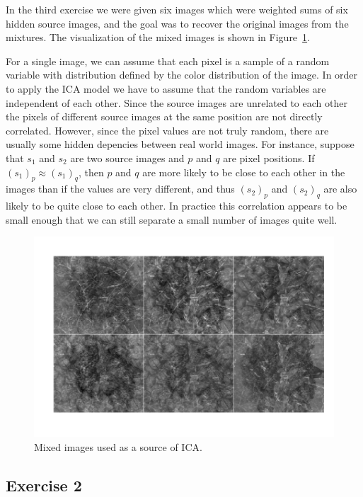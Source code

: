 \documentclass{article}
\begin{document}
In the third exercise we were given six images which were weighted sums of six hidden source images, and the goal was to recover the original images from the mixtures.
The visualization of the mixed images is shown in Figure~\ref{fig:mixed}.

For a single image, we can assume that each pixel is a sample of a random variable with distribution defined by the color distribution of the image.
In order to apply the ICA model we have to assume that the random variables are independent of each other.
Since the source images are unrelated to each other the pixels of different source images at the same position are not directly correlated.
However, since the pixel values are not truly random, there are usually some hidden depencies between real world images.
For instance, suppose that $s_1$ and $s_2$ are two source images and $p$ and $q$ are pixel positions.
If $(s_1)_p\approx(s_1)_q$, then $p$ and $q$ are more likely to be close to each other in the images than if the values are very different, and thus $(s_2)_p$ and $(s_2)_q$ are also likely to be quite close to each other.
In practice this correlation appears to be small enough that we can still separate a small number of images quite well.

\newcommand\iscale{0.45}
\begin{figure}\centering
	\includegraphics[scale=\iscale]{mixed}
	\caption{Mixed images used as a source of ICA.}\label{fig:mixed}
\end{figure}

\subsection{Exercise 2}
\end{document}
